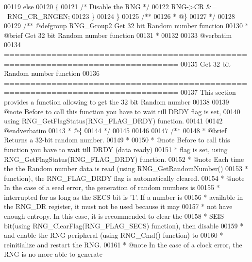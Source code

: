 \begin{DoxyCode}
00119   \textcolor{keywordflow}{else}
00120   \{
00121     \textcolor{comment}{/* Disable the RNG */}
00122     RNG->CR &= ~RNG_CR_RNGEN;
00123   \}
00124 \}
00125 \textcolor{comment}{/**}
00126 \textcolor{comment}{  * @\}}
00127 \textcolor{comment}{  */}
00128 
00129 \textcolor{comment}{/** @defgroup RNG\_Group2 Get 32 bit Random number function}
00130 \textcolor{comment}{ *  @brief    Get 32 bit Random number function }
00131 \textcolor{comment}{ *}
00132 \textcolor{comment}{}
00133 \textcolor{comment}{@verbatim    }
00134 \textcolor{comment}{ ===============================================================================}
00135 \textcolor{comment}{                      Get 32 bit Random number function}
00136 \textcolor{comment}{ ===============================================================================  }
00137 \textcolor{comment}{  This section provides a function allowing to get the 32 bit Random number  }
00138 \textcolor{comment}{  }
00139 \textcolor{comment}{  @note  Before to call this function you have to wait till DRDY flag is set,}
00140 \textcolor{comment}{         using RNG\_GetFlagStatus(RNG\_FLAG\_DRDY) function. }
00141 \textcolor{comment}{   }
00142 \textcolor{comment}{@endverbatim}
00143 \textcolor{comment}{  * @\{}
00144 \textcolor{comment}{  */}
00145 
00146 
00147 \textcolor{comment}{/**}
00148 \textcolor{comment}{  * @brief  Returns a 32-bit random number.}
00149 \textcolor{comment}{  *   }
00150 \textcolor{comment}{  * @note   Before to call this function you have to wait till DRDY (data ready)}
00151 \textcolor{comment}{  *         flag is set, using RNG\_GetFlagStatus(RNG\_FLAG\_DRDY) function.}
00152 \textcolor{comment}{  * @note   Each time the the Random number data is read (using RNG\_GetRandomNumber()}
00153 \textcolor{comment}{  *         function), the RNG\_FLAG\_DRDY flag is automatically cleared.}
00154 \textcolor{comment}{  * @note   In the case of a seed error, the generation of random numbers is }
00155 \textcolor{comment}{  *         interrupted for as long as the SECS bit is '1'. If a number is }
00156 \textcolor{comment}{  *         available in the RNG\_DR register, it must not be used because it may }
00157 \textcolor{comment}{  *         not have enough entropy. In this case, it is recommended to clear the }
00158 \textcolor{comment}{  *         SEIS bit(using RNG\_ClearFlag(RNG\_FLAG\_SECS) function), then disable }
00159 \textcolor{comment}{  *         and enable the RNG peripheral (using RNG\_Cmd() function) to }
00160 \textcolor{comment}{  *         reinitialize and restart the RNG.}
00161 \textcolor{comment}{  * @note   In the case of a clock error, the RNG is no more able to generate }

\end{DoxyCode}
